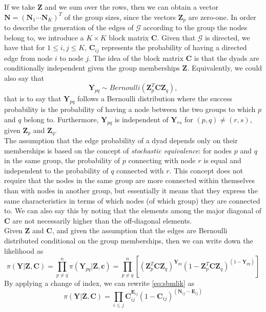 If we take $\mathbf{Z}$ and we sum over the rows, then we can obtain a vector $\mathbf{N} = (\mathbf{N}_1\cdots\mathbf{N}_K)^T$ of the group sizes, since the vectors $\mathbf{Z}_{p}$ are zero-one.
In order to describe the generation of the edges of $\mathcal{G}$ according to the group the nodes belong to, we introduce a $K \times K$ block matrix $\mathbf{C}$. Given that $\mathcal{G}$ is directed, we have that for $1 \leq i,j \leq K$, $\mathbf{C}_{ij}$ represents the probability of having a directed edge from node $i$ to node $j$. The idea of the block matrix $\mathbf{C}$ is that the dyads are conditionally independent given the group memberships $\mathbf{Z}$. Equivalently, we could also say that
\[
    \mathbf{Y}_{pq} \sim Bernoulli(\mathbf{Z}^T_p \mathbf{C} \mathbf{Z}_q),
\]
that is to say that $\mathbf{Y}_{pq}$ follows a Bernoulli distribution where the success probability is the probability of having a node between the two groups to which $p$ and $q$ belong to. Furthermore, $\mathbf{Y}_{pq}$ is independent of $\mathbf{Y}_{rs}$ for $(p,q) \neq (r,s)$, given $\mathbf{Z}_p$ and $\mathbf{Z}_q$.\\
The assumption that the edge probability of a dyad depends only on their memberships is based on the concept of \textit{stochastic equivalence}: for nodes $p$ and $q$ in the same group, the probability of $p$ connecting with node $r$ is equal and independent to the probability of $q$ connected with $r$. This concept does not require that the nodes in the same group are more connected within themselves than with nodes in another group, but essentially it means that they express the same characteristics in terms of which nodes (of which group) they are connected to. We can also say this by noting that the elements among the major diagonal of $\mathbf{C}$ are not necessarily higher than the off-diagonal elements.\\
Given $\mathbf{Z}$ and $\mathbf{C}$, and given the assumption that the edges are Bernoulli distributed conditional on the group memberships, then we can write down the likelihood as 
\begin{equation}\label{eq:sbmlik}
    \pi (\mathbf{Y}|\mathbf{Z},\mathbf{C}) = \prod_{p\neq q}^n \pi(\mathbf{Y}_{pq}|\mathbf{Z},\mathbf{c}) 
    = \prod_{p\neq q}^n \left[ \left( \mathbf{Z}^T_p \mathbf{C} \mathbf{Z}_q \right)^{\mathbf{Y}_{pq}} \left( 1 - \mathbf{Z}^T_p \mathbf{C} \mathbf{Z}_q \right)^{(1-\mathbf{Y}_{pq})} \right]
\end{equation}
By applying a change of index, we can rewrite \ref{eq:sbmlik} as
\begin{equation}
    \pi (\mathbf{Y}|\mathbf{Z},\mathbf{C}) = \prod_{i \leq j} \mathbf{C}^{\mathbf{E}_{ij}}_{ij} (1 - \mathbf{C}_{ij})^{(\mathbf{N}_{ij} - \mathbf{E}_{ij})}
\end{equation}
